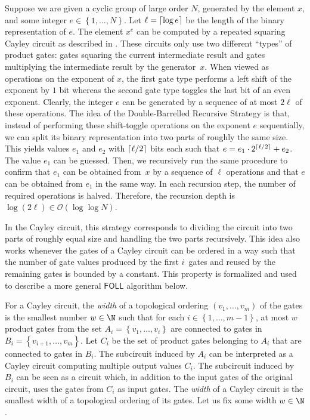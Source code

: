 \documentclass{toc}
\newcommand{\ceil}[1]{\ensuremath\left\lceil#1\right\rceil}
\newcommand{\os}[1]{\ensuremath{\left\{#1\right\}}}
\newcommand{\bigO}{\mathcal{O}}
\newcommand{\FOLL}{\ensuremath{\mathsf{FOLL}}}
\begin{document}
Suppose we are given a cyclic group of large order $N$, generated by the
element $x$, and some integer $e \in \os{1, \dots, N}$. Let 
$\ell = \ceil{\log e}$ be the length of the binary representation of $e$. 
The element $x^e$ can
be computed by a %
repeated squaring  %
Cayley circuit as described in .
%
These circuits only use two different ``types'' of product gates: gates
squaring the current intermediate result and gates multiplying the intermediate
result by the generator~$x$. When viewed as operations on the exponent of $x$,
the first gate type performs a left shift of the exponent by $1$ bit whereas
the second gate type toggles the last bit of an even exponent. Clearly, the
integer $e$ can be generated by a sequence of at most $2\ell$ of these
operations.
%
The idea of the Double-Barrelled Recursive Strategy is that, instead of
performing these shift-toggle operations on the exponent $e$ sequentially, we
can split its binary representation into two parts of roughly the same size.
This yields values $e_1$ and $e_2$ with $\ceil{\ell/2}$ bits each such that $e
= e_1 \cdot 2^{\ceil{\ell/2}} + e_2$. The value $e_1$ can be guessed. Then, we
recursively run the same procedure to confirm that $e_1$ can be obtained
from~$x$ by a sequence of $\ell$ operations and that $e$ can be obtained from
$e_1$ in the same way.
%
In each recursion step, the number of required operations is halved. Therefore,
the recursion depth is $\log(2\ell) \in \bigO(\log \log N)$.

In the Cayley circuit, this strategy corresponds to dividing the circuit into
two parts of roughly equal size and handling the two parts recursively.
%
This idea also works whenever the gates of a Cayley circuit can be ordered in a
way such that the number of gate values produced by the first $i$~gates and
reused by the remaining gates is bounded by a constant.
%
This property is formalized and used to describe a more general $\FOLL$
algorithm below.

For a Cayley circuit, the \emph{width} of a topological ordering $(v_1, \ldots,
v_m)$ of the gates is the smallest number $w \in \N$ such that for each $i \in
\os{1, \ldots, m-1}$, at most $w$ product gates from the set $A_i = \os{v_1,
\ldots, v_i}$ are connected to gates in $B_i = \os{v_{i+1}, \ldots, v_m}$.
%
Let $C_i$ be the set of product gates belonging to $A_i$ that are connected to
gates in $B_i$.
%
The subcircuit induced by $A_i$ can be interpreted as a Cayley circuit
computing multiple output values $C_i$.
%
The subcircuit induced by $B_i$ can be seen as a circuit which, in addition to
the input gates of the original circuit, uses the gates from $C_i$ as input
gates.
%
The \emph{width} of a Cayley circuit is the smallest width of a topological
ordering of its gates. Let us fix some width $w \in \N$.
\end{document}
